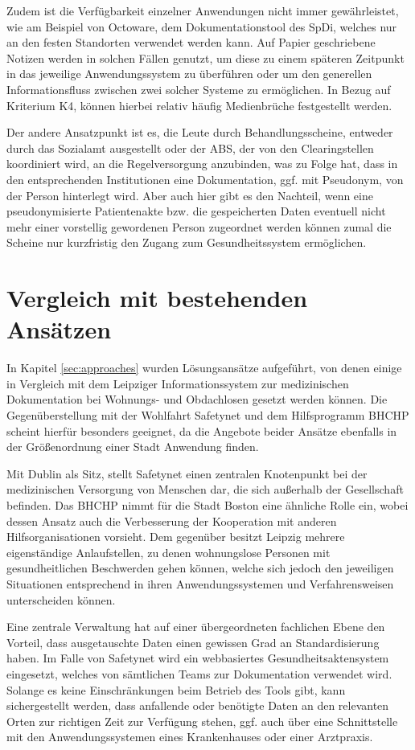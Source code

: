 Zudem ist die Verfügbarkeit einzelner Anwendungen nicht immer gewährleistet, wie am Beispiel von Octoware, dem Dokumentationstool des \ac{SpDi}, welches nur an den festen Standorten verwendet werden kann. Auf Papier geschriebene Notizen werden in solchen Fällen genutzt, um diese zu einem späteren Zeitpunkt in das jeweilige Anwendungssystem zu überführen oder um den generellen Informationsfluss zwischen zwei solcher Systeme zu ermöglichen. In Bezug auf Kriterium K4, können hierbei relativ häufig Medienbrüche festgestellt werden.

Der andere Ansatzpunkt ist es, die Leute durch Behandlungsscheine, entweder durch das Sozialamt ausgestellt oder der \ac{ABS}, der von den Clearingstellen koordiniert wird, an die Regelversorgung anzubinden, was zu Folge hat, dass in den entsprechenden Institutionen eine Dokumentation, ggf. mit Pseudonym, von der Person hinterlegt wird. Aber auch hier gibt es den Nachteil, wenn eine pseudonymisierte Patientenakte bzw. die gespeicherten Daten eventuell nicht mehr einer vorstellig gewordenen Person zugeordnet werden können zumal die Scheine nur kurzfristig den Zugang zum Gesundheitssystem ermöglichen.


\section{Vergleich mit bestehenden Ansätzen}\label{sec:compare}

In Kapitel \ref{sec:approaches} wurden Lösungsansätze aufgeführt, von denen einige in Vergleich mit dem Leipziger Informationssystem zur medizinischen Dokumentation bei Wohnungs- und Obdachlosen gesetzt werden können. Die Gegenüberstellung mit der Wohlfahrt Safetynet und dem Hilfsprogramm BHCHP scheint hierfür besonders geeignet, da die Angebote beider Ansätze ebenfalls in der Größenordnung einer Stadt Anwendung finden. 

Mit Dublin als Sitz, stellt Safetynet einen zentralen Knotenpunkt bei der medizinischen Versorgung von Menschen dar, die sich außerhalb der Gesellschaft befinden. Das BHCHP nimmt für die Stadt Boston eine ähnliche Rolle ein, wobei dessen Ansatz auch die Verbesserung der Kooperation mit anderen Hilfsorganisationen vorsieht. Dem gegenüber besitzt Leipzig mehrere eigenständige Anlaufstellen, zu denen wohnungslose Personen mit gesundheitlichen Beschwerden gehen können, welche sich jedoch den jeweiligen Situationen entsprechend in ihren Anwendungssystemen und Verfahrensweisen unterscheiden können.

Eine zentrale Verwaltung hat auf einer übergeordneten fachlichen Ebene den Vorteil, dass ausgetauschte Daten einen gewissen Grad an Standardisierung haben. Im Falle von Safetynet wird ein webbasiertes Gesundheitsaktensystem eingesetzt, welches von sämtlichen Teams zur Dokumentation verwendet wird. Solange es keine Einschränkungen beim Betrieb des Tools gibt, kann sichergestellt werden, dass anfallende oder benötigte Daten an den relevanten Orten zur richtigen Zeit zur Verfügung stehen, ggf. auch über eine Schnittstelle mit den Anwendungssystemen eines Krankenhauses oder einer Arztpraxis.

